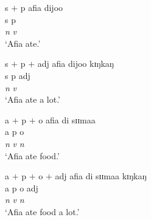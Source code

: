  \begin{minipage}[h]{12cm}
\begin{exe}

\ex\label{ex:GRM-core-S-A-O}

\begin{xlist}
\begin{multicols}{2}

\ex\label{ex:GRM-core-S-O}{ {\sc s}  $+$ {\sc p} }
\glll afia dijoo\\
 {\sc s}  {\sc p}\\
{\it n} {\it v}\\
`Afia ate.'


\ex\label{ex:GRM-core-S-O}{ {\sc s}  $+$ {\sc p} $+$  {\sc adj}}
\glll afia dijoo kɪŋkaŋ\\
 {\sc s}  {\sc p} {\sc adj} \\
{\it n} {\it v}  \\
`Afia ate a lot.'


\ex\label{ex:GRM-core-A-O}{ {\sc a}  $+$ {\sc p}  $+$  {\sc o}}
\glll afia di sɪɪmaa  \\
 {\sc a}  {\sc p}  {\sc o}\\
{\it n} {\it v} {\it n}\\
`Afia ate food.'


\ex\label{ex:GRM-core-A-O}{ {\sc a}  $+$ {\sc p}  $+$  {\sc o} $+$  {\sc adj}}
\glll afia di sɪɪmaa kɪŋkaŋ  \\
 {\sc a}  {\sc p}  {\sc o} {\sc adj}\\
{\it n} {\it v} {\it n}   \\
`Afia ate food a lot.'


\end{multicols}
\end{xlist}
\end{exe}
 \end{minipage}
\vspace*{15pt}




